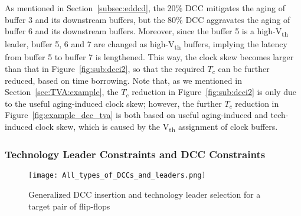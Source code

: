 As mentioned in Section~\ref{subsec:eddcd}, the 20\% DCC mitigates the aging of buffer 3 and its downstream buffers, but the 80\% DCC aggravates the aging of buffer 6 and its downstream buffers. Moreover, since the buffer 5 is a high-V\textsubscript{th} leader, buffer 5, 6 and 7 are changed as high-V\textsubscript{th} buffers, implying the latency from buffer 5 to buffer 7 is lengthened. This way, the clock skew becomes larger than that in Figure~\ref{fig:sub:dcci2}, so that the required $T_c$ can be further reduced, based on time borrowing. Note that, as we mentioned in Section~\ref{sec:TVA:example}, the $T_c$ reduction in Figure~\ref{fig:sub:dcci2} is only due to the useful aging-induced clock skew; however, the  further $T_c$ reduction in Figure~\ref{fig:example_dcc_tva} is both based on useful aging-induced and tech-induced clock skew, which is caused by the V\textsubscript{th} assignment of clock buffers. 

\subsubsection{Technology Leader Constraints and DCC Constraints}
\label{sec:TVA:constraints}
\begin{figure}
    \centering
    \texttt{[image: All\_types\_of\_DCCs\_and\_leaders.png]}
    \caption{Generalized DCC insertion and technology leader selection for a target pair of flip-flops}
    \label{fig:g_dcc_leader}
\end{figure}

